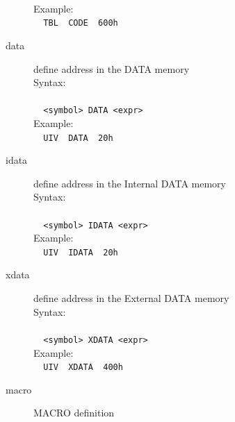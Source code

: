 \documentclass[a4paper,twoside,12pt]{book}
\begin{document}
\begin{description}
				\verb''\\
				Example:\\
				\verb'  '{\color{highlight_constant}\verb'TBL'}\verb'  '{\color{highlight_directive}\verb'CODE'}\verb'  '{\color{highlight_hex}\verb'600h'}\\
			\item[data] define address in the DATA memory\\
				Syntax:\\\\
				\verb'  '{\color{highlight_constant}\verb'<symbol>'}\verb' '{\color{highlight_directive}\verb'DATA'}\verb' '{\color{highlight_symbol}\verb'<'}{\color{highlight_constant}\verb'expr'}{\color{highlight_symbol}\verb'>'}\\
				Example:\\
				\verb'  '{\color{highlight_constant}\verb'UIV'}\verb'  '{\color{highlight_directive}\verb'DATA'}\verb'  '{\color{highlight_hex}\verb'20h'}\\
			\item[idata] define address in the Internal DATA memory\\
				Syntax:\\\\
				\verb'  '{\color{highlight_constant}\verb'<symbol>'}\verb' '{\color{highlight_directive}\verb'IDATA'}\verb' '{\color{highlight_symbol}\verb'<'}{\color{highlight_constant}\verb'expr'}{\color{highlight_symbol}\verb'>'}\\
				Example:\\
				\verb'  '{\color{highlight_constant}\verb'UIV'}\verb'  '{\color{highlight_directive}\verb'IDATA'}\verb'  '{\color{highlight_hex}\verb'20h'}\\
			\item[xdata] define address in the External DATA memory\\
				Syntax:\\\\
				\verb'  '{\color{highlight_constant}\verb'<symbol>'}\verb' '{\color{highlight_directive}\verb'XDATA'}\verb' '{\color{highlight_symbol}\verb'<'}{\color{highlight_constant}\verb'expr'}{\color{highlight_symbol}\verb'>'}\\
				Example:\\
				\verb'  '{\color{highlight_constant}\verb'UIV'}\verb'  '{\color{highlight_directive}\verb'XDATA'}\verb'  '{\color{highlight_hex}\verb'400h'}\\
			\item[macro] MACRO definition\\

\end{description}
\end{document}
